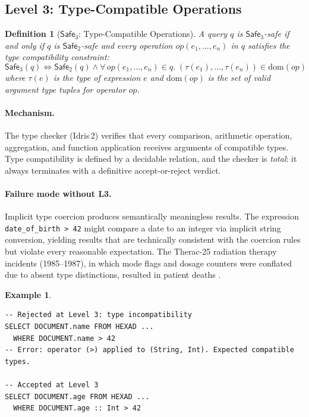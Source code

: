 \documentclass[11pt,a4paper]{article}
\newtheorem{definition}[theorem]{Definition}
\newtheorem{example}[theorem]{Example}
\newcommand{\LevelN}[1]{\textsf{L#1}}
\newcommand{\Safe}[1]{\ensuremath{\mathsf{Safe}_{#1}}}
\begin{document}
\subsection{Level 3: Type-Compatible Operations}\label{sec:L3}

\begin{definition}[\Safe{3}: Type-Compatible Operations]
A query $q$ is \Safe{3}-safe if and only if $q$ is \Safe{2}-safe and
every operation $\mathit{op}(e_1, \ldots, e_n)$ in $q$ satisfies the
type compatibility constraint:
\[
  \Safe{3}(q) \iff \Safe{2}(q) \land
  \forall\, \mathit{op}(e_1, \ldots, e_n) \in q.\;
  (\tau(e_1), \ldots, \tau(e_n)) \in \mathrm{dom}(\mathit{op})
\]
where $\tau(e)$ is the type of expression $e$ and $\mathrm{dom}(\mathit{op})$
is the set of valid argument type tuples for operator $\mathit{op}$.
\end{definition}

\paragraph{Mechanism.}
The type checker (Idris\,2) verifies that every comparison, arithmetic
operation, aggregation, and function application receives arguments
of compatible types.  Type compatibility is defined by a decidable
relation, and the checker is \emph{total}: it always terminates with
a definitive accept-or-reject verdict.

\paragraph{Failure mode without \LevelN{3}.}
Implicit type coercion produces semantically meaningless results.  The
expression \texttt{date\_of\_birth > 42} might compare a date to an
integer via implicit string conversion, yielding results that are
technically consistent with the coercion rules but violate every
reasonable expectation.  The Therac-25 radiation therapy incidents
(1985--1987), in which mode flags and dosage counters were conflated
due to absent type distinctions, resulted in patient deaths
\citep{leveson1993therac}.

\begin{example}
\begin{lstlisting}[language=VQL]
-- Rejected at Level 3: type incompatibility
SELECT DOCUMENT.name FROM HEXAD ...
  WHERE DOCUMENT.name > 42
-- Error: operator (>) applied to (String, Int). Expected compatible types.

-- Accepted at Level 3
SELECT DOCUMENT.age FROM HEXAD ...
  WHERE DOCUMENT.age :: Int > 42
\end{lstlisting}
\end{example}
\end{document}
